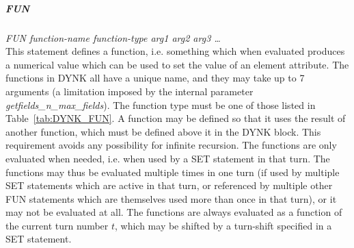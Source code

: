 \documentclass[a4paper,11pt]{report}
\begin{document}
\subparagraph{FUN} \emph{FUN function-name function-type arg1 arg2 arg3 \ldots}\\
This statement defines a function, i.e. something which when evaluated produces a numerical value which can be used to set the value of an element attribute.
The functions in DYNK all have a unique name, and they may take up to 7 arguments (a limitation imposed by the internal parameter \emph{getfields\_n\_max\_fields}).
The function type must be one of those listed in Table~\ref{tab:DYNK_FUN}.
A function may be defined so that it uses the result of another function, which must be defined above it in the DYNK block.
This requirement avoids any possibility for infinite recursion.
The functions are only evaluated when needed, i.e. when used by a SET statement in that turn.
The functions may thus be evaluated multiple times in one turn (if used by multiple SET statements which are active in that turn, or referenced by multiple other FUN statements which are themselves used more than once in that turn), or it may not be evaluated at all.
The functions are always evaluated as a function of the current turn number $t$, which may be shifted by a turn-shift specified in a SET statement.
\end{document}

